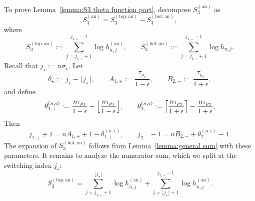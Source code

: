 \documentclass[a4paper]{article}
\numberwithin{equation}{section}
\begin{document}
To prove Lemma~\ref{lemma:S3 theta function part}, decompose $S_3^{(\mathrm{an})}$ as
\begin{equation}
\label{def of S3 annulus two parts}
S_3^{(\mathrm{an})}=S_3^{(\mathrm{top},\mathrm{an})}-S_3^{(\mathrm{bot},\mathrm{an})},
\end{equation}
where 
\[
S_3^{(\mathrm{top},\mathrm{an})}:=\sum_{j=j_{1,+}+1}^{j_{2,-}-1}\log h_{n,j}^{(\mathrm{an})}, \qquad
S_3^{(\mathrm{bot},\mathrm{an})}:=\sum_{j=j_{1,+}+1}^{j_{2,-}-1}\log h_{n,j}.
\]
Recall that $j_{\star}:=n\sigma_{\star}$. 
Let 
\[
\theta_{\star}:=j_{\star}-\lfloor j_{\star}\rfloor,\qquad A_{1,+}:=\frac{\tau_{\rho_1}}{1-\epsilon},\qquad B_{2,-}:=\frac{\tau_{\rho_2}}{1+\epsilon}, 
\]
and define
\begin{equation*}
    \theta_{1,+}^{(n,\epsilon)}:=\frac{n\tau_{\rho_1}}{1-\epsilon}-\Bigl\lfloor \frac{n\tau_{\rho_1}}{1-\epsilon}\Bigr\rfloor,\qquad \theta_{2,-}^{(n,\epsilon)}:=\Bigl\lceil \frac{n\tau_{\rho_2}}{1+\epsilon}\Bigr\rceil-\frac{n\tau_{\rho_2}}{1+\epsilon},
\end{equation*}
Then
\[
j_{1,+}+1=nA_{1,+}+1-\theta_{1,+}^{(n,\epsilon)},\qquad
j_{2,-}-1=nB_{2,-}+\theta_{2,-}^{(n,\epsilon)}-1.
\]
The expansion of $S_3^{(\mathrm{bot},\mathrm{an})}$ follows from Lemma~\ref{lemma:general sum} with these parameters. It remains to analyze the numerator sum, which we split at the switching index $j_\star$:
\[
   S_3^{(\mathrm{top},\mathrm{an})}=
    \sum_{j=j_{1,+}+1}^{\lfloor j_{\star} \rfloor}\log h_{n,j}^{(\mathrm{an})}
    +
    \sum_{j=\lfloor j_{\star} \rfloor+1}^{j_{2,-}-1}\log h_{n,j}^{(\mathrm{an})}.
\]
\end{document}
